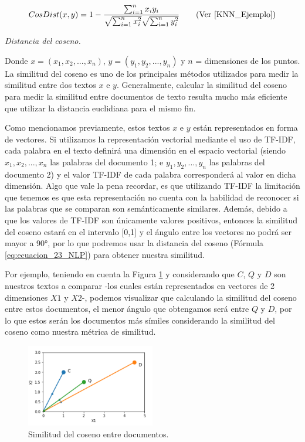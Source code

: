 \documentclass[12pt,a4paper]{article}
\begin{document}
\begin{sloppypar}
\begin{equation}\label{eq:ecuacion_23_NLP}
CosDist(x,y) = 1 - \frac{\sum_{i=1}^{n} x_{i} y_{i}} { \sqrt{\sum_{i=1}^{n} x_{i}^{2}}  \sqrt{\sum_{i=1}^{n} y_{i}^{2}} }     \qquad \text{(Ver \cite{KNN_Ejemplo})}
\end{equation}
\begin{center}
\textit{Distancia del coseno.}
\end{center}

Donde $x= (x_1,x_2,..., x_n)$, $y = (y_1,y_2,...,y_n)$ y $n$ = dimensiones de los puntos.
\\

La similitud del coseno es uno de los principales métodos utilizados para medir la similitud entre dos textos $x$ e $y$. Generalmente, calcular la similitud del coseno para medir la similitud entre documentos de texto resulta mucho más eficiente que utilizar la distancia euclidiana para el mismo fin\cite{similarity_survey}.

Como mencionamos previamente, estos textos $x$ e $y$ están representados en forma de vectores. Si utilizamos la representación vectorial mediante el uso de TF-IDF, cada palabra en el texto definirá una dimensión en el espacio vectorial (siendo $x_1, x_2,..., x_n$ las palabras del documento 1; e $y_1, y_2,..., y_n$ las palabras del documento 2) y el valor TF-IDF de cada palabra corresponderá al valor en dicha dimensión. Algo que vale la pena recordar, es que utilizando TF-IDF la limitación que tenemos es que esta representación no cuenta con la habilidad de reconocer si las palabras que se comparan son semánticamente similares. Además, debido a que los valores de TF-IDF son únicamente valores positivos, entonces la similitud del coseno estará en el intervalo [0,1] y el ángulo entre los vectores no podrá ser mayor a 90°, por lo que podremos usar la distancia del coseno (Fórmula \ref{eq:ecuacion_23_NLP}) para obtener nuestra similitud\cite{NLP_19}.

Por ejemplo, teniendo en cuenta la Figura \ref{fig:Imagen_NLP_35} y considerando que $C$, $Q$ y $D$ son nuestros textos a comparar -los cuales están representados en vectores de 2 dimensiones $X1$ y $X2$-, podemos visualizar que calculando la similitud del coseno entre estos documentos, el menor ángulo que obtengamos será entre $Q$ y $D$, por lo que estos serán los documentos más símiles considerando la similitud del coseno como nuestra métrica de similitud.  

\begin{figure}[H]    
 \centering
 \includegraphics[width=0.5\textwidth]{images/NLP/35.png}
 \caption{Similitud del coseno entre documentos\cite{NLP_19}.}
 \label{fig:Imagen_NLP_35}
\end{figure}


\end{sloppypar}
\end{document}
